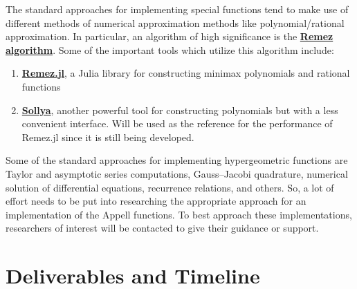 \documentclass{article}
\theoremstyle{mytheoremstyle}
\theoremstyle{mytheoremstyle}
\theoremstyle{myproblemstyle}
\begin{document}
      The standard approaches for implementing special functions tend to make use of different methods of numerical approximation methods like polynomial/rational approximation. 
      In particular, an algorithm of high significance is the \href{https://en.wikipedia.org/wiki/Remez_algorithm}{\textbf{Remez algorithm}}.
      Some of the important tools which utilize this algorithm include: \begin{enumerate}
        \item \href{https://github.com/simonbyrne/Remez.jl}{\textbf{Remez.jl}}, a Julia library for constructing minimax polynomials and rational functions 
        \item \href{https://www.sollya.org/}{\textbf{Sollya}}, another powerful tool for constructing polynomials but with a less convenient interface. Will be used as the reference for the performance of Remez.jl since it is still being developed.
      \end{enumerate}
      Some of the standard approaches for implementing hypergeometric functions are Taylor and asymptotic series computations, Gauss–Jacobi quadrature, numerical solution of differential equations, recurrence relations, and others.\cite{nmhg}
      So, a lot of effort needs to be put into researching the appropriate approach for an implementation of the Appell functions.
      To best approach these implementations, researchers of interest will be contacted to give their guidance or support.
    
  \section*{Deliverables and Timeline}\label{sec:Methods} %
\end{document}
